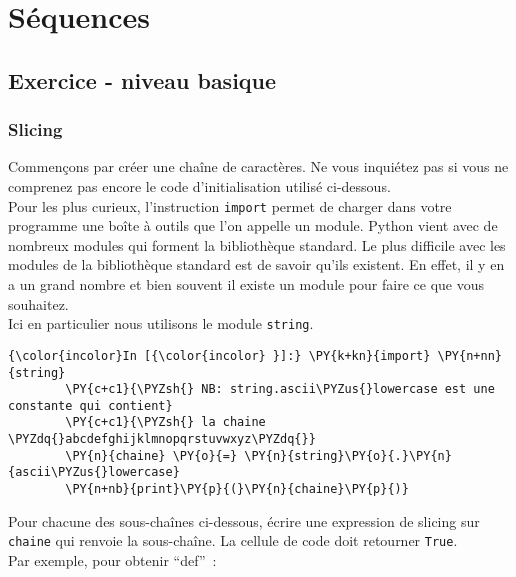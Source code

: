     \hypertarget{suxe9quences}{%
\section{Séquences}\label{suxe9quences}}

    \hypertarget{exercice---niveau-basique}{%
\subsection{Exercice - niveau basique}\label{exercice---niveau-basique}}

    \hypertarget{slicing}{%
\subsubsection{Slicing}\label{slicing}}

    Commençons par créer une chaîne de caractères. Ne vous inquiétez pas si
vous ne comprenez pas encore le code d'initialisation utilisé
ci-dessous.\\

Pour les plus curieux, l'instruction \texttt{import} permet de charger
dans votre programme une boîte à outils que l'on appelle un module.
Python vient avec de nombreux modules qui forment la bibliothèque
standard. Le plus difficile avec les modules de la bibliothèque standard
est de savoir qu'ils existent. En effet, il y en a un grand nombre et
bien souvent il existe un module pour faire ce que vous souhaitez.\\

Ici en particulier nous utilisons le module \texttt{string}.

    \begin{Verbatim}[commandchars=\\\{\}]
{\color{incolor}In [{\color{incolor} }]:} \PY{k+kn}{import} \PY{n+nn}{string}
        \PY{c+c1}{\PYZsh{} NB: string.ascii\PYZus{}lowercase est une constante qui contient}
        \PY{c+c1}{\PYZsh{} la chaine \PYZdq{}abcdefghijklmnopqrstuvwxyz\PYZdq{}}
        \PY{n}{chaine} \PY{o}{=} \PY{n}{string}\PY{o}{.}\PY{n}{ascii\PYZus{}lowercase}
        \PY{n+nb}{print}\PY{p}{(}\PY{n}{chaine}\PY{p}{)}
\end{Verbatim}


    Pour chacune des sous-chaînes ci-dessous, écrire une expression de
slicing sur \texttt{chaine} qui renvoie la sous-chaîne. La cellule de
code doit retourner \texttt{True}.\\

    Par exemple, pour obtenir ``def''~:

